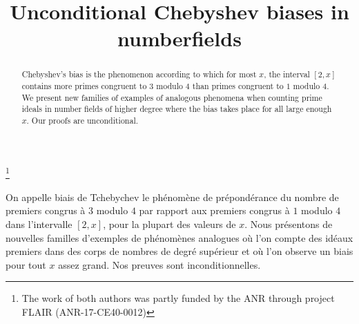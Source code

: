 \documentclass[JEP,XML,SOM,Unicode,NoEqCountersInSection,NoFloatCountersInSection,published]{cedram}
\theoremstyle{definition}
\begin{document}
\frontmatter

\title{Unconditional Chebyshev biases in number\nobreakspace fields}

\author[\initial{D.} \lastname{Fiorilli}]{ }
\address{Univ. Paris-Saclay, CNRS, Laboratoire de mathématiques d'Orsay\\
91405, Orsay, France}

\author[\initial{F.} \lastname{Jouve}]{ }
\address{Univ. Bordeaux, CNRS, Bordeaux INP, IMB, UMR 5251\\
F-33400, Talence, France}

\thanks{The work of both authors was partly funded by the ANR through project FLAIR (ANR-17-CE40-0012)}

\begin{abstract}
Chebyshev's bias is the phenomenon according to which for most $x$, the interval $[2,x]$ contains more primes congruent to $3$ modulo $4$ than primes congruent to $1$ modulo $4$. We present new families of examples of analogous phenomena when counting prime ideals in number fields of higher degree where the bias takes place for all large enough $x$. Our proofs are unconditional.
\end{abstract}





\begin{altabstract}
On appelle biais de Tchebychev le phénomène de prépondérance du nombre de premiers congrus à $3$ modulo $4$ par rapport aux premiers congrus à $1$ modulo $4$ dans l'intervalle $[2,x]$, pour la plupart des valeurs de $x$. Nous présentons de nouvelles familles d'exemples de phénomènes analogues où l'on compte des idéaux premiers dans des corps de nombres de degré supérieur et où l'on observe un biais pour tout $x$ assez grand. Nos preuves sont inconditionnelles.
\end{altabstract}
\end{document}
